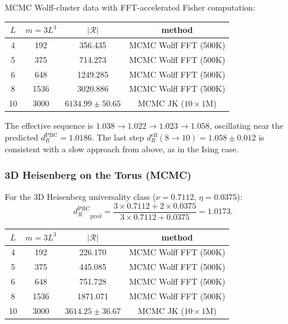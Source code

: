 \documentclass[11pt]{article}
\theoremstyle{definition}
\theoremstyle{remark}
\newcommand{\Scal}{\mathcal{R}}
\begin{document}
MCMC Wolff-cluster data with FFT-accelerated Fisher computation:

\begin{center}
\renewcommand{\arraystretch}{1.2}
\begin{tabular}{cccc}
\toprule
$L$ & $m = 3L^3$ & $|\Scal|$ & method \\
\midrule
4  & 192  & 356.435  & MCMC Wolff FFT (500K) \\
5  & 375  & 714.273  & MCMC Wolff FFT (500K) \\
6  & 648  & 1249.285 & MCMC Wolff FFT (500K) \\
8  & 1536 & 3020.886 & MCMC Wolff FFT (500K) \\
10 & 3000 & $6134.99 \pm 50.65$ & MCMC JK ($10 \times 1$M) \\
\bottomrule
\end{tabular}
\end{center}

The effective sequence is $1.038 \to 1.022 \to 1.023 \to 1.058$,
oscillating near the predicted $d_R^{\mathrm{PBC}} = 1.0186$.
The last step $d_R^{\mathrm{eff}}(8{\to}10) = 1.058 \pm 0.012$
is consistent with a slow approach from above, as in the Ising case.

\subsubsection{3D Heisenberg on the Torus (MCMC)}

For the 3D Heisenberg universality class ($\nu = 0.7112$, $\eta = 0.0375$):
\begin{equation}
  {d_R^{\mathrm{PBC}}}_{\text{pred}} = \frac{3 \times 0.7112 + 2 \times 0.0375}
    {3 \times 0.7112 + 0.0375} = 1.0173.
  \label{eq:pbc-3dheis-pred}
\end{equation}

\begin{center}
\renewcommand{\arraystretch}{1.2}
\begin{tabular}{cccc}
\toprule
$L$ & $m = 3L^3$ & $|\Scal|$ & method \\
\midrule
4  & 192  & 226.170  & MCMC Wolff FFT (500K) \\
5  & 375  & 445.085  & MCMC Wolff FFT (500K) \\
6  & 648  & 751.728  & MCMC Wolff FFT (500K) \\
8  & 1536 & 1871.071 & MCMC Wolff FFT (500K) \\
10 & 3000 & $3614.25 \pm 36.67$ & MCMC JK ($10 \times 1$M) \\
\bottomrule
\end{tabular}
\end{center}
\end{document}
